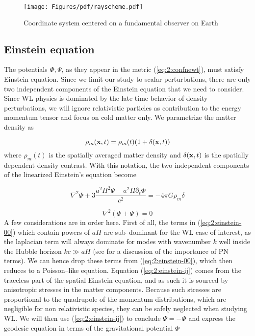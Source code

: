 \begin{figure}
\begin{center}
\texttt{[image: Figures/pdf/rayscheme.pdf]}
\end{center}
\caption{Coordinate system centered on a fundamental observer on Earth}
\label{fig:2:scheme}
\end{figure}

\subsection{Einstein equation}
The potentials $\Phi,\Psi$, as they appear in the metric (\ref{eq:2:confnewt}), must satisfy Einstein equation. Since we limit our study to scalar perturbations, there are only two independent components of the Einstein equation that we need to consider. Since WL physics is dominated by the late time behavior of density perturbations, we will ignore relativistic particles as contribution to the energy momentum tensor and focus on cold matter only. We parametrize the matter density as 

\begin{equation}
\label{eq:2:matterrho}
\rho_m(\mathbf{x},t) = \rho_m(t)(1+\delta(\mathbf{x},t))
\end{equation}
%
where $\rho_m(t)$ is the spatially averaged matter density and $\delta(\mathbf{x},t)$ is the spatially dependent density contrast. With this notation, the two independent components of the linearized Einstein's equation become

\begin{equation}
\label{eq:2:einstein-00}
\nabla^2\Phi +3\frac{a^2H^2\Psi-a^2H\partial_t\Phi}{c^2} = -4\pi G\rho_m\delta
\end{equation}

\begin{equation}
\label{eq:2:einstein-ij}
\nabla^2(\Phi+\Psi) = 0
\end{equation}
%
A few considerations are in order here. First of all, the terms in (\ref{eq:2:einstein-00}) which contain powers of $aH$ are sub--dominant for the WL case of interest, as the laplacian term will always dominate for modes with wavenumber $k$ well inside the Hubble horizon $kc\gg aH$ (see \citep{PNLensing} for a discussion of the importance of PN terms). We can hence drop these terms from (\ref{eq:2:einstein-00}), which then reduces to a Poisson--like equation. Equation (\ref{eq:2:einstein-ij}) comes from the traceless part of the spatial Einstein equation, and as such it is sourced by anisotropic stresses in the matter components. Because such stresses are proportional to the quadrupole of the momentum distributions, which are negligible for non relativistic species, they can be safely neglected when studying WL. We will then use (\ref{eq:2:einstein-ij}) to conclude $\Psi=-\Phi$ and express the geodesic equation in terms of the gravitational potential $\Phi$

